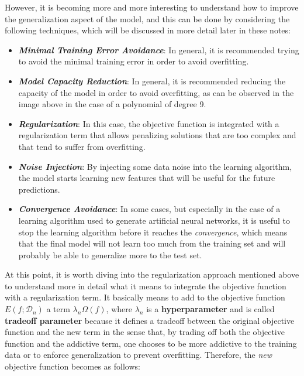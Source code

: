 However, it is becoming more and more interesting to understand how to improve
the generalization aspect of the model, and this can be done by considering
the following techniques, which will be discussed in more detail later in these notes:

\begin{itemize}
      \item \emph{\textbf{Minimal Training Error Avoidance}}: In general, it is
            recommended trying to avoid the minimal training error in order to avoid
            overfitting.
      \item \emph{\textbf{Model Capacity Reduction}}: In general, it is recommended
            reducing the capacity of the model in order to avoid overfitting, as can
            be observed in the image above in the case of a polynomial of degree 9.
      \item \emph{\textbf{Regularization}}: In this case, the objective function is
            integrated with a regularization term that allows penalizing solutions
            that are too complex and that tend to suffer from overfitting.
      \item \emph{\textbf{Noise Injection}}: By injecting some data noise into the
            learning algorithm, the model starts learning new features that
            will be useful for the future predictions.
      \item \emph{\textbf{Convergence Avoidance}}: In some cases, but especially
            in the case of a learning algorithm used to generate artificial neural
            networks, it is useful to stop the learning algorithm before it reaches the
            \emph{convergence}, which means that the final model will not learn too much
            from the training set and will probably be able to generalize more to the
            test set.
\end{itemize}

At this point, it is worth diving into the regularization approach mentioned above
to understand more in detail what it means to integrate the objective function
with a regularization term. It basically means to add to the objective function
$E(f; \mathcal{D}_n)$ a term $\lambda_n \Omega(f)$, where $\lambda_n$ is a
\textbf{hyperparameter} and is called \textbf{tradeoff parameter} because it
defines a tradeoff between the original objective function and the new term
in the sense that, by trading off both the objective function and the addictive term,
one chooses to be more addictive to the training data or to enforce generalization
to prevent overfitting. Therefore, the \emph{new} objective function becomes as follows:

